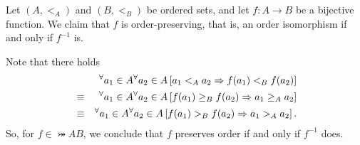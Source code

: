 \documentclass[a4paper,12pt]{article}
\begin{document}
\begin{prp}\label{prop:sufcdn_iso}
	\leavevmode \par \noindent
	Let
	\( (A,<_{A})\)
	and
	\( (B,<_{B}) \)
	be ordered sets,
	and let \( f:A\to B \) be a bijective function.
	We claim that
	\( f \) is order-preserving, that is, an order isomorphism
	if and only if
	\( f ^{-1} \) is.
\end{prp}
\begin{prf}
	Note that there holds
	\begin{eqnarray*}
		&&
		{}^{\forall}  a_1 \in A
		{}^{\forall}  a_2 \in A
		\left[ a_1 <_{A} a_2 \Rightarrow f(a_1) <_{B} f(a_2) \right]\\
		&\equiv&
		{}^{\forall}  a_1 \in A
		{}^{\forall}  a_2 \in A
		\left[f(a_1) \ge_{B} f(a_2) \Rightarrow  a_1 \ge_{A} a_2 \right]\\
		&\equiv&
		{}^{\forall}  a_1 \in A
		{}^{\forall}  a_2 \in A
		\left[f(a_1) >_{B} f(a_2) \Rightarrow  a_1 >_{A} a_2 \right].
	\end{eqnarray*}
	So, for
	\( f\in \bij{A}{B} \),
	we conclude that
	\( f \)
	preserves order if and only if \( f^{-1} \) does.
\end{prf}
\end{document}

